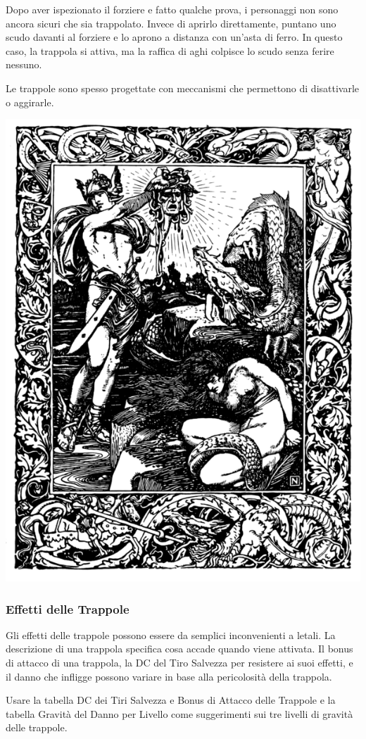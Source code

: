 \begin{multicols}{2}
Dopo aver ispezionato il forziere e fatto qualche prova, i personaggi non sono ancora sicuri che sia trappolato. Invece di aprirlo direttamente, puntano uno scudo davanti al forziere e lo aprono a distanza con un'asta di ferro. In questo caso, la trappola si attiva, ma la raffica di aghi colpisce lo scudo senza ferire nessuno.

Le trappole sono spesso progettate con meccanismi che permettono di disattivarle o aggirarle.

\medskip

\begin{center}
\includegraphics[width=0.7\linewidth]{immagini/medusa.png}
\end{center}

\subsubsection{Effetti delle Trappole}
Gli effetti delle trappole possono essere da semplici inconvenienti a letali. La descrizione di una trappola specifica cosa accade quando viene attivata.
Il bonus di attacco di una trappola, la DC del Tiro Salvezza per resistere ai suoi effetti, e il danno che infligge possono variare in base alla pericolosità della trappola.

Usare la tabella DC dei Tiri Salvezza e Bonus di Attacco delle Trappole e la tabella Gravità del Danno per Livello come suggerimenti sui tre livelli di gravità delle trappole.


\end{multicols}
